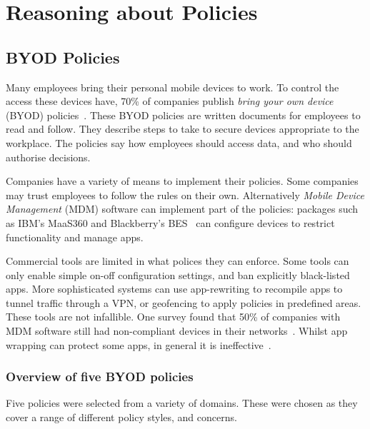 \documentclass[thesis.tex]{subfiles}
\begin{document}
\chapter{Reasoning about Policies}
\label{chap:byod}

\section{BYOD Policies}

Many employees bring their personal mobile devices to work. To control the
access these devices have, 70\% of companies publish \emph{bring your own
  device} (BYOD) policies~\cite{schulze_byod_2016}. These BYOD policies are
written documents for employees to read and follow. They describe steps to take
to secure devices appropriate to the workplace. The policies say how employees
should access data, and who should authorise decisions.

Companies have a variety of means to implement their policies. Some companies
may trust employees to follow the rules on their own. Alternatively \emph{Mobile
  Device Management} (MDM) software can implement part of the policies: packages
such as IBM's MaaS360 and Blackberry's BES~\cite{_ibm_????,_secure_????} can
configure devices to restrict functionality and manage apps.

Commercial tools are limited in what polices they can enforce. Some tools can
only enable simple on-off configuration settings, and ban explicitly
black-listed apps. More sophisticated systems can use app-rewriting to recompile
apps to tunnel traffic through a VPN, or geofencing to apply policies in
predefined areas. These tools are not infallible. One survey found that 50\% of
companies with MDM software still had non-compliant devices in their
networks~\cite{mobileiron_security_labs_q4_2015}. Whilst app wrapping can
protect some apps, in general it is ineffective~\cite{hao_effectiveness_2013}.

\subsection{Overview of five BYOD policies}

Five policies were selected from a variety of domains.
These were chosen as they cover a range of different policy styles, and
concerns.
\end{document}
